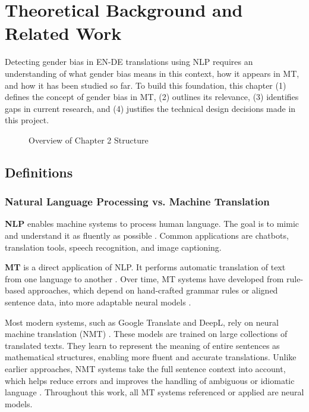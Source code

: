 \chapter{Theoretical Background and Related Work}
Detecting gender bias in EN-DE translations using NLP requires an understanding of what gender bias means in this context, how it appears in MT, and how it has been studied so far. To build this foundation, this chapter (1) defines the concept of gender bias in MT, (2) outlines its relevance, (3) identifies gaps in current research, and (4) justifies the technical design decisions made in this project.

\vspace{1cm} 
\begin{figure}[htb]
    \centering
    \scalebox{0.8}{}
    \caption{Overview of Chapter 2 Structure}
    \label{fig:workflow_theory}
\end{figure}
\vspace{1cm} 


\section{Definitions}
\subsection{Natural Language Processing vs. Machine Translation}
    \textbf{NLP} enables machine systems to process human language. The goal is to mimic and understand it as fluently as possible \parencite{smacchiaDoesAIReflect2024,ullmannGenderBiasMachine2022}. Common applications are chatbots, translation tools, speech recognition, and image captioning.

    \textbf{MT} is a direct application of NLP. It performs automatic translation of text from one language to another \parencite{linMachineTranslationAcademic2009}. Over time, MT systems have developed from rule-based approaches, which depend on hand-crafted grammar rules or aligned sentence data, into more adaptable neural models \parencite{chakravarthiSurveyOrthographicInformation2021}.

    Most modern systems, such as Google Translate and DeepL, rely on neural machine translation (NMT) \parencite{wuGooglesNeuralMachine2016,deeplHowDoesDeepL2021}. These models are trained on large collections of translated texts. They learn to represent the meaning of entire sentences as mathematical structures, enabling more fluent and accurate translations. Unlike earlier approaches, NMT systems take the full sentence context into account, which helps reduce errors and improves the handling of ambiguous or idiomatic language \parencite{wuGooglesNeuralMachine2016}. Throughout this work, all MT systems referenced or applied are neural models.


